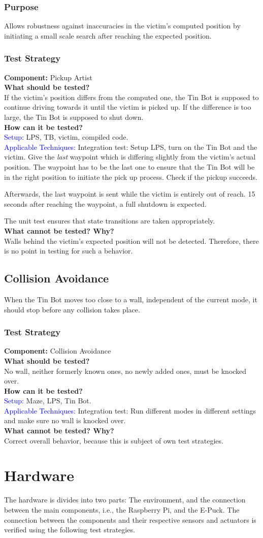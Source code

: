 \documentclass[a4paper,parskip,headheight=38pt]{scrartcl} %
\newcommand{\teststrat}[5]{
    \subsubsection{Test Strategy}
	\textbf{Component:} #1 \\
	\noindent\textbf{What should be tested?} \\
    \noindent #2 \\
	\noindent\textbf{How can it be tested?} \\
    \noindent\textcolor{blue}{Setup:} #3 \\
    \noindent\textcolor{blue}{Applicable Techniques:} #4 \\
	\noindent\textbf{What cannot be tested? Why?} \\
    \noindent #5
}
\newcommand{\ie}{i.e.}
\begin{document}
\subsubsection{Purpose}
Allows robustness against inaccuracies in the victim's computed position by
initiating a small scale search after reaching the expected position.
\teststrat{Pickup Artist}{
    If the victim's position differs from the computed one, the Tin Bot is
    supposed to continue driving towards it until the victim is picked up. If
    the difference is too large, the Tin Bot is supposed to shut down.
}{
    LPS, TB, victim, compiled code.
}{
    Integration test: Setup LPS, turn on the Tin Bot and the victim. Give the
    \emph{last} waypoint which is differing slightly from the victim's actual
    position. The waypoint has to be the last one to ensure that the Tin Bot
    will be in the right position to initiate the pick up process. Check if the
    pickup succeeds.

    Afterwards, the last waypoint is sent while the victim is entirely out of
    reach. 15 seconds after reaching the waypoint, a full shutdown is expected.

    The unit test ensures that state transitions are taken appropriately.
}{
    Walls behind the victim's expected position will not be detected. Therefore,
    there is no point in testing for such a behavior.
}

\subsection{Collision Avoidance}
When the Tin Bot moves too close to a wall, independent of the current mode, it
should stop before any collision takes place.
\teststrat{Collision Avoidance}{
    No wall, neither formerly known ones, no newly added ones, must be knocked
    over.
}{
    Maze, LPS, Tin Bot.
}{
    Integration test: Run different modes in different settings and make sure no
    wall is knocked over.
}{
    Correct overall behavior, because this is subject of own test strategies.
}

\section{Hardware} 
The hardware is divides into two parts: The environment, and the connection
between the main components, \ie, the Raspberry Pi, and the E-Puck. 
The connection between the components and their respective sensors and actuators
is verified using the following test strategies.
\end{document}
